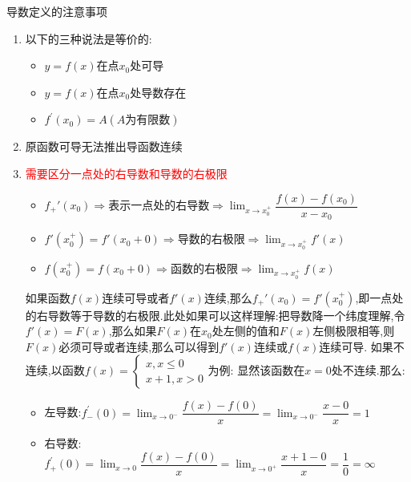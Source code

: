 \documentclass[8pt a4paper, oneside, UTF8]{ctexbook}  %
\begin{document}
\begin{sloppypar}
\begin{criterion}{导数定义的注意事项}{}
\begin{enumerate}
\begin{itemize}
                      \item $\Delta x$在趋于0的过程中没有间断点
                      \item 分子为一个动点一个定点
                  \end{itemize}
            \item 以下的三种说法是等价的:
                  \begin{itemize}
                      \item  $y=f\left(x\right)$在点$x_{0}$处可导
                      \item $y=f\left(x\right)$在点$x_{0}$处导数存在
                      \item  $f^{\prime}\left(x_{0}\right)=A\left(A\text{为有限数}\right)$
                  \end{itemize}
            \item 原函数可导无法推出导函数连续
            \item \textcolor{red}{需要区分一点处的右导数和导数的右极限}
                  \begin{itemize}
                      \item $f_+'(x_0) \Rightarrow$表示一点处的右导数$\Rightarrow \lim_{x \to x_0^+}\dfrac{f(x)-f(x_0)}{x-x_0}$
                      \item $f'(x_0 ^+)=f'(x_0+0) \Rightarrow$导数的右极限$\Rightarrow \lim_{x\to x_0^+}f'(x)$
                      \item $f(x_{0}^{+})=f(x_{0}+0) \Rightarrow$函数的右极限$\Rightarrow \lim_{x\to x ^+ _0}f(x)$
                  \end{itemize}
                  如果函数$f(x)$连续可导或者$f'(x)$连续,那么$f_+'(x_0)=f'(x_0^+)$,即一点处的右导数等于导数的右极限.此处如果可以这样理解:把导数降一个纬度理解,令$f'(x)=F(x)$,那么如果$F(x)$在$x_0$处左侧的值和$F(x)$左侧极限相等,则$F(x)$必须可导或者连续,那么可以得到$f'(x)$连续或$f(x)$连续可导.
                  如果不连续,以函数$f(x)=\begin{cases}
                          x,x \leqslant 0 \\
                          x+1,x >0
                      \end{cases}$为例:
                  显然该函数在$x=0$处不连续.那么:
                  \begin{itemize}
                      \item 左导数:$f_-^{\prime}(0)=\lim_{x\to0^{-}}\dfrac{f(x)-f(0)}{x}=\lim_{x\to0^{-}}\dfrac{x-0}{x}=1$
                      \item 右导数:$f_{+}^{\prime}(0)=\lim_{x\to0}\dfrac{f(x)-f(0)}{x}=\lim_{x\to0^{+}}\dfrac{x+1-0}{x}=\dfrac{1}{0}=\infty $

\end{itemize}
\end{enumerate}
\end{criterion}
\end{sloppypar}
\end{document}
